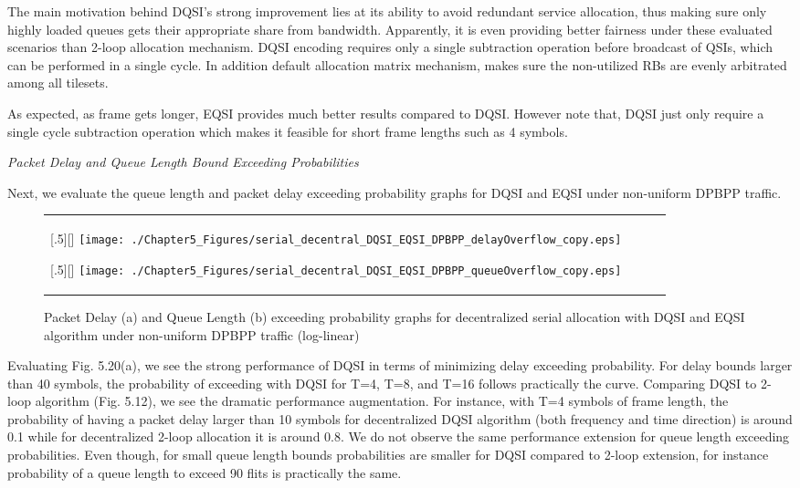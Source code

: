 The main motivation behind DQSI's strong improvement lies at its ability to avoid redundant service allocation, thus making sure only highly loaded queues gets their appropriate share from bandwidth. Apparently, it is even providing better fairness under these evaluated scenarios than 2-loop allocation mechanism. DQSI encoding requires only a single subtraction operation before broadcast of QSIs, which can be performed in a single cycle. In addition default allocation matrix mechanism, makes sure the non-utilized RBs are evenly arbitrated among all tilesets.


As expected, as frame gets longer, EQSI provides much better results compared to DQSI. However note that, DQSI just only require a single cycle subtraction operation which makes it feasible for short frame lengths such as 4 symbols.

\textit{Packet Delay and Queue Length Bound Exceeding Probabilities}


Next, we evaluate the queue length and packet delay exceeding probability graphs for DQSI and EQSI under non-uniform DPBPP traffic. 

 \begin{figure*}[htbp]
  \centering
  \begin{tabular}[c]{cccc}

  \subcaptionbox{}[.5\linewidth][]{%
    \texttt{[image: ./Chapter5\_Figures/serial\_decentral\_DQSI\_EQSI\_DPBPP\_delayOverflow\_copy.eps]} }	
    
  \subcaptionbox{}[.5\linewidth][]{%
    \texttt{[image: ./Chapter5\_Figures/serial\_decentral\_DQSI\_EQSI\_DPBPP\_queueOverflow\_copy.eps]}}
 
   \end{tabular}

  \caption{Packet Delay (a) and Queue Length (b) exceeding probability graphs for decentralized serial allocation with DQSI and EQSI algorithm under non-uniform DPBPP traffic (log-linear)}
\end{figure*}


Evaluating Fig. 5.20(a), we see the strong performance of DQSI in terms of minimizing delay exceeding probability. For delay bounds larger than 40 symbols, the probability of exceeding with DQSI for T=4, T=8, and T=16 follows practically the curve. Comparing DQSI to 2-loop algorithm (Fig. 5.12), we see the dramatic performance augmentation. For instance, with T=4 symbols of frame length, the probability of having a packet delay larger than 10 symbols for decentralized DQSI algorithm (both frequency and time direction) is around 0.1 while for decentralized 2-loop allocation it is around 0.8. We do not observe the same performance extension for queue length exceeding probabilities. Even though, for small queue length bounds probabilities are smaller for DQSI compared to 2-loop extension, for instance probability of a queue length to exceed 90 flits is practically the same. 

